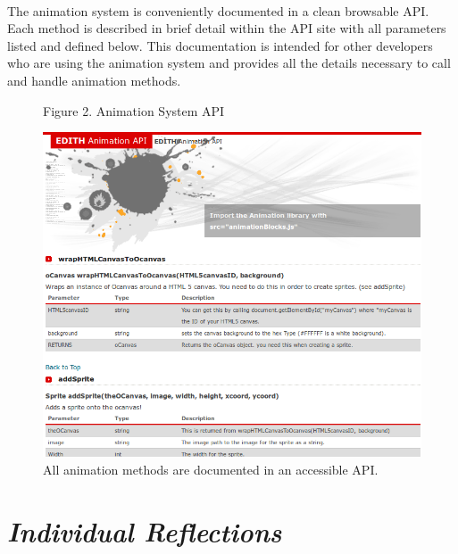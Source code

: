 \documentclass[12pt]{article}
\begin{document}
\paragraph{}
The animation system is conveniently documented in a clean browsable API. Each method is described in brief detail within the API site with all parameters listed and defined below. This documentation is intended for other developers who are using the animation system and provides all the details necessary to call and handle animation methods.
\\
\begin{figure}
\caption{Figure 2. Animation System API}
  \centering
    \includegraphics[scale=.55]{api-screenshot.png}
    \caption*{All animation methods are documented in an accessible API.}
\end{figure}

\newpage
\section{\emph{\Large Individual Reflections}}
\end{document}
